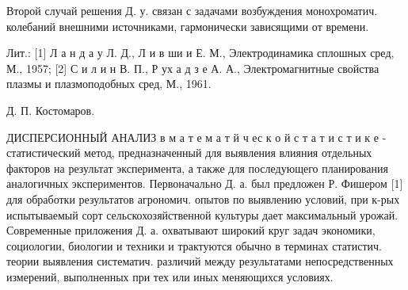 \documentclass[10pt]{article}
\begin{document}
Второй случай решения Д. у. связан с задачами возбуждения монохроматич. колебаний внешними источниками, гармонически зависящими от времени.



Лит.: [1] Л а н д а у Л. Д., Л и в ши и Е. М., Электродинамика сплошных сред, М., 1957; [2] С и л и н В. П., Р ух а д з е А. А., Электромагнитные свойства плазмы и плазмоподобных сред, М., 1961.



Д. П. Костомаров.



ДИСПЕРСИОННЫЙ АНАЛИЗ в м а т е м а т й ч ес к о й с т а т и с т и к е - статистический метод, предназначенный для выявления влияния отдельных факторов на результат эксперимента, а также для последующего планирования аналогичных экспериментов. Первоначально Д. а. был предложен Р. Фишером [1] для обработки результатов агрономич. опытов по выявлению условий, при к-рых испытываемый сорт сельскохозяйственной культуры дает максимальный урожай. Современные приложения Д. а. охватывают широкий круг задач экономики, социологии, биологии и техники и трактуются обычно в терминах статистич. теории выявления систематич. различий между результатами непосредственных измерений, выполненных при тех или иных меняющихся условиях.
\end{document}
